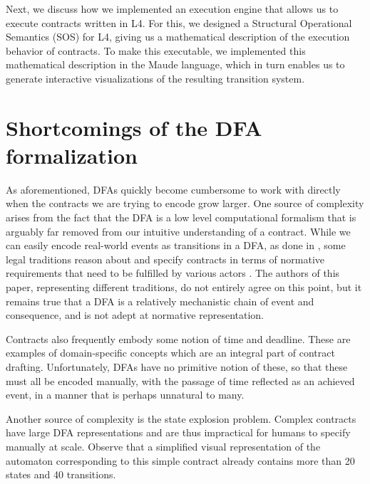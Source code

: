 \documentclass{article}
\begin{document}
Next, we  discuss how we implemented an execution engine that allows us to
execute contracts written in L4.
For this, we designed a Structural Operational Semantics (SOS)
 for L4, giving us a mathematical
description of the execution behavior of contracts.
To make this executable, we implemented this mathematical description in
the Maude language, which in turn enables us to generate interactive
visualizations of the resulting transition system.
 

\section{Shortcomings of the DFA formalization}
As aforementioned, DFAs quickly become cumbersome to work with directly when
the contracts we are trying to encode grow larger.
One source of complexity arises from the fact that the DFA is a low level
computational formalism that is arguably far removed from our intuitive
understanding of a contract.
While we can easily encode real-world events as transitions in a DFA, as done
in \cite{contract_as_automaton}, some legal traditions reason about and specify
contracts in terms of normative requirements that need to be fulfilled by
various actors \cite{normative_compliance_guido}.
The authors of this paper, representing different traditions, do not entirely
agree on this point, but it remains true that a DFA is a relatively
mechanistic chain of event and consequence, and is not adept at normative
representation.

Contracts also frequently embody some notion of time and deadline.
These are examples of domain-specific concepts which are an integral
part of contract drafting.
Unfortunately, DFAs have no primitive notion of these, so that these must all
be encoded manually, with the passage of time reflected as an achieved event,
in a manner that is perhaps unnatural to many.

Another source of complexity is the state explosion problem.
Complex contracts have large DFA representations and are thus impractical for
humans to specify manually at scale.
Observe that a simplified visual representation of the automaton
\cite[Fig. 1]{contract_as_automaton}
corresponding to this simple contract already contains more than 20 states and
40 transitions.


\end{document}
